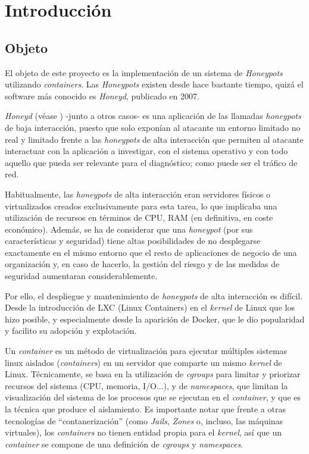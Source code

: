 \chapter{Introducción}
\minitoc{}
\section{Objeto}
El objeto de este proyecto es la implementación de un sistema de \emph{Honeypots} utilizando \emph{containers}. 
Las \emph{Honeypots} existen desde hace bastante tiempo, quizá el software más conocido es \emph{Honeyd}, publicado en 2007.

\emph{Honeyd} (véase \cite{honeynet-lowinteraction}) -junto a otros casos- es  una aplicación de las llamadas \emph{honeypots} de baja interacción, puesto que solo exponían al atacante un entorno limitado
no real y limitado frente a las \emph{honeypots} de alta interacción que permiten al atacante interactuar con la aplicación a investigar, con el sistema operativo
y con todo aquello que pueda ser relevante para el diagnóstico; como puede ser el tráfico de red.

Habitualmente, las \emph{honeypots} de alta interacción eran servidores físicos o virtualizados creados exclusivamente para esta tarea, lo que implicaba
una utilización de recursos en términos de CPU, RAM (en definitiva, en coste económico). Además, se ha de considerar que una \emph{honeypot} (por sus características
y seguridad) tiene altas posibilidades de no desplegarse exactamente en el mismo entorno que el resto de aplicaciones de negocio de una organización y, en caso de hacerlo,
la gestión del riesgo y de las medidas de seguridad aumentaran considerablemente.

Por ello, el despliegue y mantenimiento de \emph{honeypots}  de alta interacción es difícil. Desde la introducción de LXC (Linux Containers) en el \emph{kernel} de Linux que los hizo posible, y
especialmente desde la aparición de Docker, que le dio popularidad y facilito su adopción y explotación.

Un \emph{container} es un método de virtualización para ejecutar múltiples sistemas linux aislados (\emph{containers}) en un servidor que comparte un mismo \emph{kernel} de Linux. Técnicamente, se basa en la utilización
de \emph{cgroups} para limitar y priorizar recursos del sistema (CPU, memoria, I/O...), y de \emph{namespaces}, que limitan la visualización del sistema de los procesos que se ejecutan en el \emph{container}, y que es la técnica que produce el aislamiento. Es importante notar que
frente a otras tecnologías de ``contanerización'' (como \emph{Jails}, \emph{Zones} o, incluso, las máquinas virtuales), los \emph{containers} no tienen entidad propia para el \emph{kernel}, así que un \emph{container} se compone
de una definición de \emph{cgroups} y \emph{namespaces}. 

